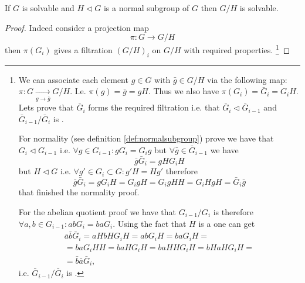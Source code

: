 \begin{property}
  If $G$ is solvable and $H \triangleleft G$ is a normal subgroup of
  $G$ then $G/H$ is solvable.
  \begin{proof}
    Indeed consider a projection map
    \begin{equation}
      \pi: G \to G/H
      \label{eq:lec8_solvable_pi}
    \end{equation}
    then $\pi\left(G_i\right)$ gives a filtration $\left(G/H\right)_i$
    on $G/H$ with required properties.
    \footnote{
      We can associate each element $g \in G$ with
      $\bar{g} \in G/H$ via the following map:
      $\pi: G \xrightarrow[g \to \bar{g}]{} G/H$. I.e.
      $\pi(g) = \bar{g} = gH$. Thus we also have
      $\pi\left(G_i\right) = \bar{G}_i = G_i H$. Lets prove that
      $\bar{G}_i$ forms the required filtration i.e. that
      $\bar{G}_i \triangleleft \bar{G}_{i-1}$
      and $\bar{G}_{i-1}/\bar{G}_i$ is .

      For normality (see definition \ref{def:normalsubgroup}) prove we
      have that 
      ${G}_i \triangleleft {G}_{i-1}$ i.e.
      $\forall g \in {G}_{i-1}: g G_i = G_i g$ but
      $\forall \bar{g} \in \bar{G}_{i-1}$ we have
      \[
      \bar{g} \bar{G}_{i} = g H G_i H
      \]
      but $H \triangleleft G$ i.e.
      $\forall g' \in G_i \subset G: g' H = H g'$ therefore
      \[
      \bar{g} \bar{G}_{i} = g G_i H =
      G_i g H = G_i g H H = G_i H g H = \bar{G}_i \bar{g}
      \]
      that finished the normality proof.

      For the abelian quotient proof we have that
      ${G}_{i-1}/{G}_i$ is  therefore
      $\forall a,b \in {G}_{i-1}: a b G_i = b a G_i$. Using the fact
      that $H$ is a  one can get
      \begin{eqnarray}
        \bar{a} \bar{b} \bar{G}_i =
        a H b H G_i H = a b G_i H = b a G_i H =
        \nonumber \\
        = b a G_i H H = b a H G_i H = b a H H G_i H =
        b H a H G_i H =
        \nonumber \\
        = \bar{b} \bar{a} \bar{G}_i,
        \nonumber 
      \end{eqnarray}
      i.e. $\bar{G}_{i-1}/\bar{G}_i$ is .
    }
  \end{proof}
  \label{property:lec8_solvable2}
\end{property}

